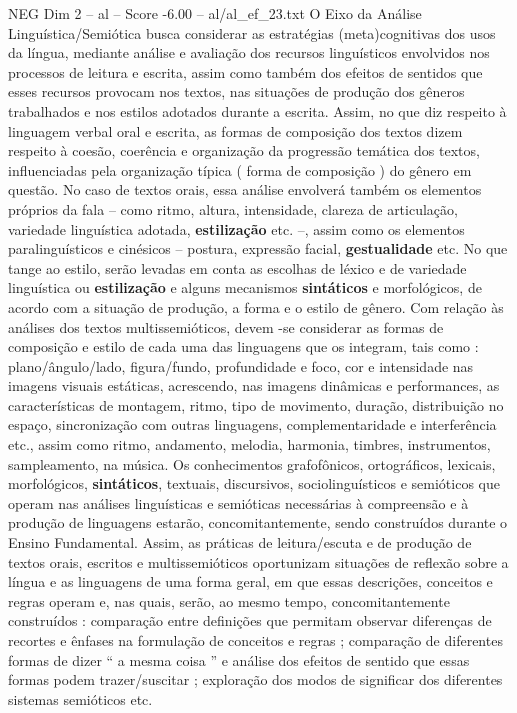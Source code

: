 \begin{textsample}{NEG Dim 2 – al – Score -6.00 – al/al\_ef\_23.txt}  \label{ex:f2_neg_022}
O Eixo da Análise Linguística/Semiótica busca considerar as estratégias (meta)cognitivas dos usos da língua, mediante análise e avaliação dos recursos linguísticos envolvidos nos processos de leitura e escrita, assim como também dos efeitos de sentidos que esses recursos provocam nos textos, nas situações de produção dos gêneros trabalhados e nos estilos adotados durante a escrita.
Assim, no que diz respeito à linguagem verbal oral e escrita, as formas de composição dos textos dizem respeito à coesão, coerência e organização da progressão temática dos textos, influenciadas pela organização típica ( forma de composição ) do gênero em questão.
No caso de textos orais, essa análise envolverá também os elementos próprios da fala – como ritmo, altura, intensidade, clareza de articulação, variedade linguística adotada, \textbf{estilização} etc. –, assim como os elementos paralinguísticos e cinésicos – postura, expressão facial, \textbf{gestualidade} etc.
No que tange ao estilo, serão levadas em conta as escolhas de léxico e de variedade linguística ou \textbf{estilização} e alguns mecanismos \textbf{sintáticos} e morfológicos, de acordo com a situação de produção, a forma e o estilo de gênero.
Com relação às análises dos textos multissemióticos, devem -se considerar as formas de composição e estilo de cada uma das linguagens que os integram, tais como : plano/ângulo/lado, figura/fundo, profundidade e foco, cor e intensidade nas imagens visuais estáticas, acrescendo, nas imagens dinâmicas e performances, as características de montagem, ritmo, tipo de movimento, duração, distribuição no espaço, sincronização com outras linguagens, complementaridade e interferência etc., assim como ritmo, andamento, melodia, harmonia, timbres, instrumentos, sampleamento, na música.
Os conhecimentos grafofônicos, ortográficos, lexicais, morfológicos, \textbf{sintáticos}, textuais, discursivos, sociolinguísticos e semióticos que operam nas análises linguísticas e semióticas necessárias à compreensão e à produção de linguagens estarão, concomitantemente, sendo construídos durante o Ensino Fundamental.
Assim, as práticas de leitura/escuta e de produção de textos orais, escritos e multissemióticos oportunizam situações de reflexão sobre a língua e as linguagens de uma forma geral, em que essas descrições, conceitos e regras operam e, nas quais, serão, ao mesmo tempo, concomitantemente construídos : comparação entre definições que permitam observar diferenças de recortes e ênfases na formulação de conceitos e regras ; comparação de diferentes formas de dizer “ a mesma coisa ” e análise dos efeitos de sentido que essas formas podem trazer/suscitar ; exploração dos modos de significar dos diferentes sistemas semióticos etc.

\end{textsample}
